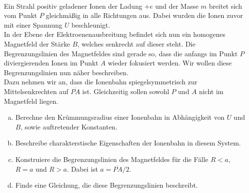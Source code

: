 \begin{Exercise}[title = Ionen im Magnetfeld, origin = 8. IPhO 1975, difficulty = 4, label = ions]
	\begin{center}	
		\\
	\end{center}
	Ein Strahl positiv geladener Ionen der Ladung $+e$ und der Masse $m$ breitet sich vom Punkt $P$ gleichmäßig in alle Richtungen aus. Dabei wurden die Ionen zuvor mit einer Spannung $U$ beschleunigt.\\
	In der Ebene der Elektroenenausbreitung befindet sich nun ein homogenes Magnetfeld der Stärke $B$, welches senkrecht auf dieser steht. Die Begrenzungslinien des Magnetfeldes sind gerade so, dass die anfangs im Punkt $P$ diviergierenden Ionen im Punkt $A$ wieder fokusiert werden. Wir wollen diese Begrenzungslinien nun näher beschreiben.\\
	Dazu nehmen wir an, dass die Ionenbahn spiegelsymmetrisch zur Mittelsenkrechten auf $\overline{PA}$ ist. Gleichzeitig sollen sowohl $P$ und $A$ nicht im Magnetfeld liegen. 
	\begin{enumerate}[a)]
		\item Berechne den Krümmungsradius einer Ionenbahn in Abhängigkeit von $U$ und $B$, sowie auftretender Konstanten.
		\item Beschreibe charakterstische Eigenschaften der Ionenbahn in diesem System.
		\item Konstruiere die Begrenzungslinien des Magnetfeldes für die Fälle $R<a$, $R=a$ und $R>a$. 	Dabei ist $a = \overline{PA}/2$.
		\item Finde eine Gleichung, die diese Begrenzungslinien beschreibt.
	\end{enumerate}

\end{Exercise}